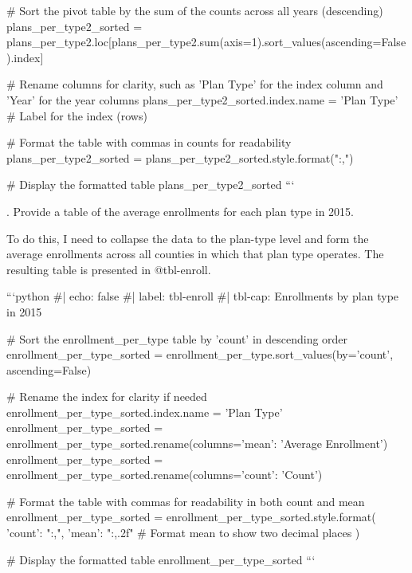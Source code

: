 # Sort the pivot table by the sum of the counts across all years (descending)
plans_per_type2_sorted = plans_per_type2.loc[plans_per_type2.sum(axis=1).sort_values(ascending=False).index]

# Rename columns for clarity, such as 'Plan Type' for the index column and 'Year' for the year columns
plans_per_type2_sorted.index.name = 'Plan Type'  # Label for the index (rows)

# Format the table with commas in counts for readability
plans_per_type2_sorted = plans_per_type2_sorted.style.format("{:,}")

# Display the formatted table
plans_per_type2_sorted
``` 




\newpage
{}. Provide a table of the average enrollments for each plan type in 2015.

To do this, I need to collapse the data to the plan-type level and form the average enrollments across all counties in which that plan type operates. The resulting table is presented in @tbl-enroll.

```{python}
#| echo: false
#| label: tbl-enroll
#| tbl-cap: Enrollments by plan type in 2015

# Sort the enrollment_per_type table by 'count' in descending order
enrollment_per_type_sorted = enrollment_per_type.sort_values(by='count', ascending=False)

# Rename the index for clarity if needed
enrollment_per_type_sorted.index.name = 'Plan Type'
enrollment_per_type_sorted = enrollment_per_type_sorted.rename(columns={'mean': 'Average Enrollment'})
enrollment_per_type_sorted = enrollment_per_type_sorted.rename(columns={'count': 'Count'})

# Format the table with commas for readability in both count and mean
enrollment_per_type_sorted = enrollment_per_type_sorted.style.format({
    'count': "{:,}",
    'mean': "{:,.2f}"  # Format mean to show two decimal places
})

# Display the formatted table
enrollment_per_type_sorted
``` 
